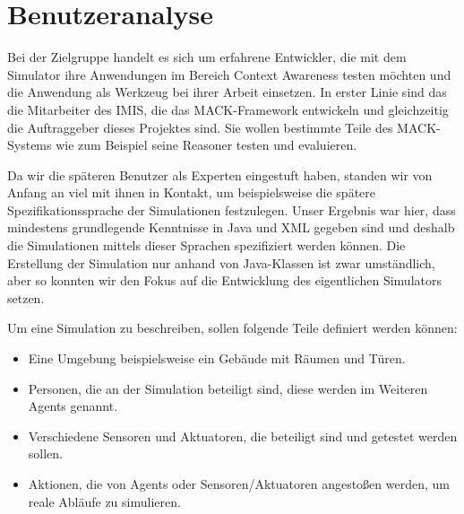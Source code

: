 
\section{Benutzeranalyse}\label{sec:user_ana}

Bei der Zielgruppe handelt es sich um erfahrene Entwickler, die mit dem Simulator ihre Anwendungen im Bereich Context Awareness testen möchten und die Anwendung als Werkzeug bei ihrer Arbeit einsetzen. In erster Linie sind das die Mitarbeiter des IMIS, die das MACK-Framework entwickeln und gleichzeitig die Auftraggeber dieses Projektes sind. Sie wollen bestimmte Teile des MACK-Systems wie zum Beispiel seine Reasoner testen und evaluieren.

Da wir die späteren Benutzer als Experten eingestuft haben, standen wir von Anfang an viel mit ihnen in Kontakt, um beispielsweise die spätere Spezifikationssprache der Simulationen festzulegen. Unser Ergebnis war hier, dass mindestens grundlegende Kenntnisse in Java und XML gegeben sind und deshalb die Simulationen mittels dieser Sprachen spezifiziert werden können. Die Erstellung der Simulation nur anhand von Java-Klassen ist zwar umständlich, aber so konnten wir den Fokus auf die Entwicklung des eigentlichen Simulators setzen.

Um eine Simulation zu beschreiben, sollen folgende Teile definiert werden können:
\begin{itemize}
\item Eine Umgebung beispielsweise ein Gebäude mit Räumen und Türen.
\item Personen, die an der Simulation beteiligt sind, diese werden im Weiteren Agents genannt.
\item Verschiedene Sensoren und Aktuatoren, die beteiligt sind und getestet werden sollen.
\item Aktionen, die von Agents oder Sensoren/Aktuatoren angestoßen werden, um reale Abläufe zu simulieren.
\end{itemize}
  


